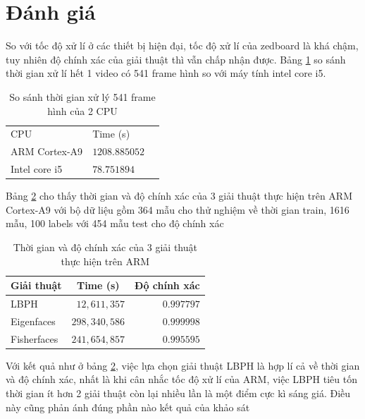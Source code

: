 \documentclass[a4paper]{report}
\begin{document}
\section{Đánh giá}
So với tốc độ xử lí ở các thiết bị hiện đại, tốc độ xử lí của zedboard là khá chậm, tuy nhiên độ chính xác của giải thuật thì vẫn chấp nhận được. Bảng \ref{table:sosanh} so sánh thời gian xử lí hết 1 video có 541 frame hình so với máy tính intel core i5.

\begin{table}[H]
\centering
\begin{tabular}{|l|l|l}
\cline{1-2}
CPU           				& Time (s)    				&  \\ \cline{1-2}
ARM Cortex-A9 		& $1208.885052$ 		&  \\ \cline{1-2}
Intel core i5 				& $78.751894$  			 &  \\ \cline{1-2}
\end{tabular}
\caption{So sánh thời gian xử lý 541 frame hình của 2 CPU}
\label{table:sosanh}
\end{table} 

Bảng \ref{table:sosanh2} cho thấy thời gian và độ chính xác của 3 giải thuật thực hiện trên ARM Cortex-A9 với bộ dữ liệu gồm 364 mẫu cho thử nghiệm về thời gian train, 1616 mẫu, 100 labels với 454 mẫu test cho độ chính xác
\begin{table}[H]
\centering
\begin{tabular}{|l|r|r|}
\hline
\multicolumn{1}{|c|}{Giải thuật} 	& \multicolumn{1}{c|}{Time (s)} 		& \multicolumn{1}{|c|}{Độ chính xác} \\ \hline
LBPH                            				& $12,611,357$                    			&  $0.997797$                                     \\ \hline
Eigenfaces                       			& $298,340,586$                   			&  $0.999998$                                             \\ \hline
Fisherfaces                     				& $241,654,857$                  			&  $0.995595$                                            \\ \hline
\end{tabular}
\caption{Thời gian và độ chính xác của 3 giải thuật thực hiện trên ARM}
\label{table:sosanh2}
\end{table}
Với kết quả như ở bảng \ref{table:sosanh2}, việc lựa chọn giải thuật LBPH là hợp lí cả về thời gian và độ chính xác, nhất là khi cân nhắc tốc độ xử lí của ARM, việc LBPH tiêu tốn thời gian ít hơn 2 giải thuật còn lại nhiều lần là một điểm cực kì sáng giá. Điều này cũng phản ánh đúng phần nào kết quả của khảo sát \cite{sosanh}
\end{document}
